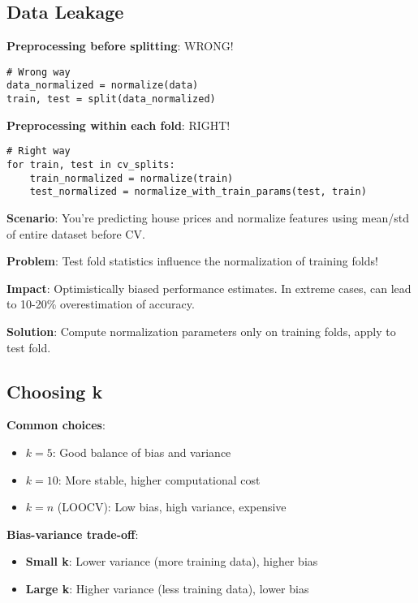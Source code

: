 \documentclass{article}
\newcounter{example}
\begin{document}
\subsection{Data Leakage}

\textbf{Preprocessing before splitting}: WRONG!
\begin{verbatim}
# Wrong way
data_normalized = normalize(data)
train, test = split(data_normalized)
\end{verbatim}

\textbf{Preprocessing within each fold}: RIGHT!
\begin{verbatim}
# Right way
for train, test in cv_splits:
    train_normalized = normalize(train)
    test_normalized = normalize_with_train_params(test, train)
\end{verbatim}

\begin{tcolorbox}[colback=red!5!white,colframe=red!75!black,title=Example \stepcounter{example}\#\theexample: The Leakage Problem]

\textbf{Scenario}: You're predicting house prices and normalize features using mean/std of entire dataset before CV.

\textbf{Problem}: Test fold statistics influence the normalization of training folds!

\textbf{Impact}: Optimistically biased performance estimates. In extreme cases, can lead to 10-20\% overestimation of accuracy.

\textbf{Solution}: Compute normalization parameters only on training folds, apply to test fold.
\end{tcolorbox}

\subsection{Choosing k}

\textbf{Common choices}:
\begin{itemize}
    \item $k = 5$: Good balance of bias and variance
    \item $k = 10$: More stable, higher computational cost
    \item $k = n$ (LOOCV): Low bias, high variance, expensive
\end{itemize}

\textbf{Bias-variance trade-off}:
\begin{itemize}
    \item \textbf{Small k}: Lower variance (more training data), higher bias
    \item \textbf{Large k}: Higher variance (less training data), lower bias
\end{itemize}
\end{document}
